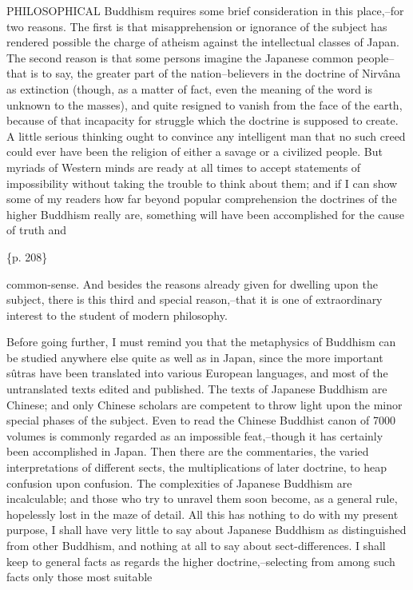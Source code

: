 PHILOSOPHICAL Buddhism requires some brief consideration in this place,--for two reasons. The first is that misapprehension or ignorance of the subject has rendered possible the charge of atheism against the intellectual classes of Japan. The second reason is that some persons imagine the Japanese common people--that is to say, the greater part of the nation--believers in the doctrine of Nirvâna as extinction (though, as a matter of fact, even the meaning of the word is unknown to the masses), and quite resigned to vanish from the face of the earth, because of that incapacity for struggle which the doctrine is supposed to create. A little serious thinking ought to convince any intelligent man that no such creed could ever have been the religion of either a savage or a civilized people. But myriads of Western minds are ready at all times to accept statements of impossibility without taking the trouble to think about them; and if I can show some of my readers how far beyond popular comprehension the doctrines of the higher Buddhism really are, something will have been accomplished for the cause of truth and

\{p. 208\}

common-sense. And besides the reasons already given for dwelling upon the subject, there is this third and special reason,--that it is one of extraordinary interest to the student of modern philosophy.



Before going further, I must remind you that the metaphysics of Buddhism can be studied anywhere else quite as well as in Japan, since the more important sûtras have been translated into various European languages, and most of the untranslated texts edited and published. The texts of Japanese Buddhism are Chinese; and only Chinese scholars are competent to throw light upon the minor special phases of the subject. Even to read the Chinese Buddhist canon of 7000 volumes is commonly regarded as an impossible feat,--though it has certainly been accomplished in Japan. Then there are the commentaries, the varied interpretations of different sects, the multiplications of later doctrine, to heap confusion upon confusion. The complexities of Japanese Buddhism are incalculable; and those who try to unravel them soon become, as a general rule, hopelessly lost in the maze of detail. All this has nothing to do with my present purpose, I shall have very little to say about Japanese Buddhism as distinguished from other Buddhism, and nothing at all to say about sect-differences. I shall keep to general facts as regards the higher doctrine,--selecting from among such facts only those most suitable

